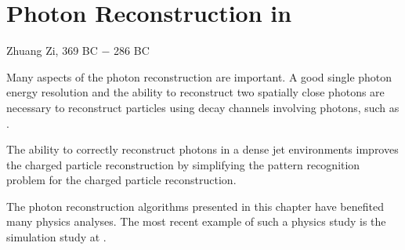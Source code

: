 \chapter{Photon Reconstruction in \pandora}
\label{chap:Photon}

%
{Zhuang Zi, 369 BC $-$ 286 BC}

Many aspects of the photon reconstruction are important. A good single photon energy resolution and the ability to reconstruct two spatially close photons are necessary to reconstruct particles using decay channels involving photons, such as \HepProcess{\Ppizero\to\Pgamma\Pgamma}.



The ability to correctly reconstruct photons in a dense jet environments improves the charged particle reconstruction by simplifying the  pattern recognition problem for the charged particle reconstruction.


The photon reconstruction algorithms presented in this chapter have benefited many physics analyses. The most recent example of such a physics study is the  \HepProcess{\PHiggs \to \Pgamma \Pgamma} simulation study at  \CLIC \cite{Kacarevic:higgsToGammaGamma}.

